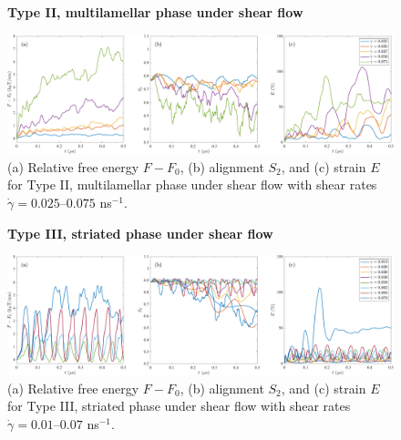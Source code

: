 \begin{figure}[h!]
\textbf{Type II, multilamellar phase under shear flow}\par\medskip
\begin{center}
\includegraphics[width=\textwidth]{SMFigures/MLShRaw.pdf}
\end{center}
\caption{(a) Relative free energy $F - F_0$, (b) alignment $S_2$, and
  (c) strain $E$ for Type II, multilamellar phase under shear flow with
  shear rates $\dot\gamma=0.025$--$0.075$ ns$^{-1}$.
}
\label{fig:mlshraw}
\end{figure}


\begin{figure}[h!]
\textbf{Type III, striated phase under shear flow}\par\medskip
\begin{center}
\includegraphics[width=\textwidth]{SMFigures/StShRaw.pdf}
\end{center}
\caption{(a) Relative free energy $F - F_0$, (b) alignment $S_2$, and
  (c) strain $E$ for Type III, striated phase under shear flow with
  shear rates $\dot\gamma=0.01$--$0.07$ ns$^{-1}$.
}
\label{fig:stshraw}
\end{figure}

